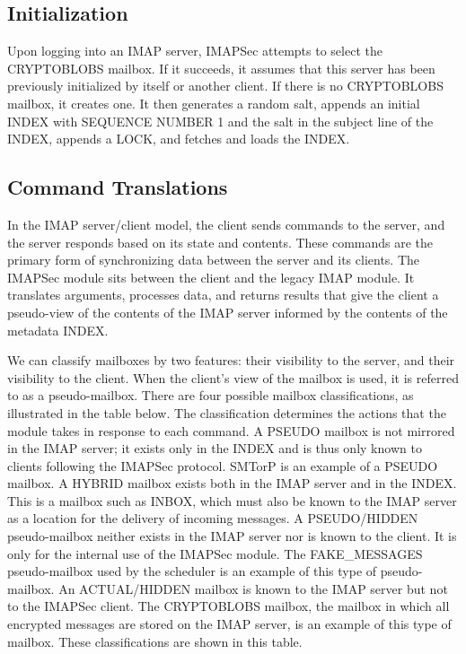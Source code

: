\documentclass[pageno]{jpaper}
\newcommand{\project}{IMAPSec }
\begin{document}
\subsection{Initialization}
\label{initialization}

Upon logging into an IMAP server, \project attempts to select the CRYPTOBLOBS mailbox. If it succeeds, it assumes that this server has been previously initialized by itself or another client. If there is no CRYPTOBLOBS mailbox, it creates one. It then generates a random salt, appends an initial INDEX with SEQUENCE NUMBER 1 and the salt in the subject line of the INDEX, appends a LOCK, and fetches and loads the INDEX.

\subsection{Command Translations}
In the IMAP server/client model, the client sends commands to the server, and the server responds based on its state and contents. These commands are the primary form of synchronizing data between the server and its clients. The \project module sits between the client and the legacy IMAP module. It translates arguments, processes data, and returns results that give the client a pseudo-view of the contents of the IMAP server informed by the contents of the metadata INDEX.

We can classify mailboxes by two features: their visibility to the server, and their visibility to the client. When the client's view of the mailbox is used, it is referred to as a pseudo-mailbox. There are four possible mailbox classifications, as illustrated in the table below. The classification determines the actions that the module takes in response to each command. A PSEUDO mailbox is not mirrored in the IMAP server; it exists only in the INDEX and is thus only known to clients following the \project protocol. SMTorP is an example of a PSEUDO mailbox. A HYBRID mailbox exists both in the IMAP server and in the INDEX. This is a mailbox such as INBOX, which must also be known to the IMAP server as a location for the delivery of incoming messages. A PSEUDO/HIDDEN pseudo-mailbox neither exists in the IMAP server nor is known to the client. It is only for the internal use of the \project module. The FAKE\_MESSAGES pseudo-mailbox used by the scheduler is an example of this type of pseudo-mailbox. An ACTUAL/HIDDEN mailbox is known to the IMAP server but not to the \project client. The CRYPTOBLOBS mailbox, the mailbox in which all encrypted messages are stored on the IMAP server, is an example of this type of mailbox. These classifications are shown in this table.
\end{document}
